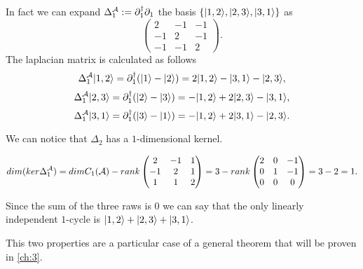 \documentclass[../2.tex]{subfiles}
\begin{document}
    \begin{exa}
        In fact we can expand $\Delta_1^{\mathcal{A}} := \partial_1^\dagger\partial_1$ the basis $\{| 1,2 \rangle,| 2,3 \rangle,| 3,1 \rangle\}$ as
        \[\begin{pmatrix}
            2 & -1 & -1  \\
            -1 & 2 & -1  \\
            -1& -1 & 2 
        \end{pmatrix}.\] 
        The laplacian matrix is calculated as follows
        \[\Delta_1^{\mathcal{A}}| 1,2 \rangle = \partial_1^\dagger(| 1 \rangle-| 2 \rangle) = 2| 1,2 \rangle-| 3,1 \rangle-| 2,3 \rangle,\]
        \[\Delta_1^{\mathcal{A}}| 2,3 \rangle = \partial_1^\dagger(| 2 \rangle-| 3 \rangle) = -| 1,2 \rangle+2| 2,3 \rangle-| 3,1 \rangle,\]
        \[\Delta_1^{\mathcal{A}}| 3,1 \rangle = \partial_1^\dagger(| 3 \rangle-| 1 \rangle) = -| 1,2 \rangle+2| 3,1 \rangle-| 2,3 \rangle.\]

        We can notice that $\Delta_2$ has a $1$-dimensional kernel.

        \[ dim(ker\Delta_1^{\mathcal{A}}) = dimC_1(\mathcal{A}) - rank
            \begin{pmatrix}
                2 & -1 & 1  \\
                -1 & 2 & 1  \\
                1& 1 & 2 
            \end{pmatrix} = 3 - rank
            \begin{pmatrix}
                2 & 0 & -1  \\
                0 & 1 & -1  \\
                0 & 0 & 0 
            \end{pmatrix} = 3 - 2 =  1. \]

        Since the sum of the three raws is $0$ we can say that the only linearly independent $1$-cycle is $| 1,2 \rangle+| 2,3 \rangle+| 3,1 \rangle$.
    \end{exa}

    This two properties are a particular case of a general theorem that will be proven in \autoref{ch:3}.
\end{document}
